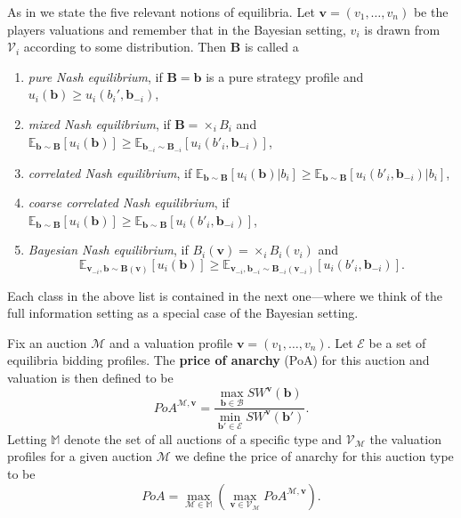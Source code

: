 As in \cite{Christodoulou2016TightBounds} we state the five relevant notions of equilibria. Let $ \mathbf{v}=(v_1, \ldots, v_n) $ be the players valuations and remember that in the Bayesian setting, $ v_i $ is drawn from $ \mathcal{V}_i $ according to some distribution. Then $ \mathbf{B} $ is called a
\begin{enumerate}[label=(\alph*)]
  \item \textit{pure Nash equilibrium}, if $ \mathbf{B}=\mathbf{b} $ is a pure strategy profile and $ u_i(\mathbf{b}) \geq u_i(b_i', \mathbf{b}_{-i}) $,

  \item \textit{mixed Nash equilibrium}, if $ \mathbf{B} = \times_i B_i $ and $ \mathbb{E}_{\mathbf{b}\sim \mathbf{B}}[u_i(\mathbf{b})] \geq \mathbb{E}_{\mathbf{b}_{-i} \sim \mathbf{B}_{-i}}[u_i(b'_i, \mathbf{b}_{-i})] $,

  \item \textit{correlated Nash equilibrium}, if $  \mathbb{E}_{\mathbf{b}\sim \mathbf{B}}[u_i(\mathbf{b})|b_i] \geq \mathbb{E}_{\mathbf{b} \sim \mathbf{B}}[u_i(b'_i, \mathbf{b}_{-i})|b_i]  $,

  \item \textit{coarse correlated Nash equilibrium}, if $  \mathbb{E}_{\mathbf{b}\sim \mathbf{B}}[u_i(\mathbf{b})] \geq \mathbb{E}_{\mathbf{b} \sim \mathbf{B}}[u_i(b'_i, \mathbf{b}_{-i})]  $,

  \item \textit{Bayesian Nash equilibrium}, if $ B_i(\mathbf{v}) = \times_i B_i(v_i) $ and $$ \mathbb{E}_{\mathbf{v}_{-i}, \mathbf{b}\sim \mathbf{B}(\mathbf{v})}[u_i(\mathbf{b})] \geq \mathbb{E}_{\mathbf{v}_{-i}, \mathbf{b}_{-i} \sim \mathbf{B}_{-i}(\mathbf{v}_{-i})}[u_i(b'_i, \mathbf{b}_{-i})]. $$
\end{enumerate}

Each class in the above list is contained in the next one---where we think of the full information setting as a special case of the Bayesian setting.

\begin{definition}
  Fix an auction $ \mathcal{M} $ and a valuation profile $ \mathbf{v}=(v_1, \ldots, v_n) $. Let $ \mathcal{E} $ be a set of equilibria bidding profiles. The \textbf{price of anarchy} (PoA) for this auction and valuation is then defined to be
  \begin{equation}
    PoA^{\mathcal{M}, \mathbf{v}} = \frac{\max_{\mathbf{b} \in \mathcal{B}} SW^\mathbf{v}(\mathbf{b})}{\min_{\mathbf{b}' \in \mathcal{E}}SW^{\mathbf{v}}(\mathbf{b}')}.
    \label{eq:poa}
  \end{equation}
  Letting $ \mathbb{M} $ denote the set of all auctions of a specific type and $ \mathcal{V}_\mathcal{M} $ the valuation profiles for a given auction $ \mathcal{M} $ we define the price of anarchy for this auction type to be
  \begin{equation}
    PoA = \max_{\mathcal{M} \in \mathbb{M}}\left( \max_{\mathbf{v} \in \mathcal{V}_{\mathcal{M}}} PoA^{\mathcal{M}, \mathbf{v}}\right).
    \label{eq:poagen}
  \end{equation}
\end{definition}


